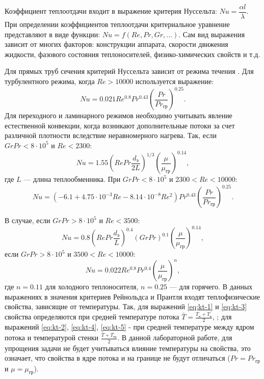 Коэффициент теплоотдачи входит в выражение критерия Нуссельта: $Nu=\dfrac{\alpha l}{\lambda}$. При определении коэффициентов теплоотдачи критериальное уравнение представляют в виде функции: $Nu= f (Re, Pr, Gr, ...)$. Сам вид выражения зависит от многих факторов: конструкции аппарата, скорости движения жидкости, фазового состояния теплоносителей, физико-химических свойств и т.д. 

Для прямых труб сечения критерий Нуссельта зависит от режима течения \cite{posobie}. Для турбулентного режима, когда $Re>10000$ используется выражение:
\begin{equation} \label{eq:kt-1}
	Nu=0.021 Re^{0.8} Pr^{0.43} \left( \dfrac{Pr}{Pr_{гр}} \right) ^{0.25} .
\end{equation}
Для переходного и ламинарного режимов необходимо учитывать явление естественной конвекции, когда возникают дополнительные потоки за счет различной плотности вследствие неравномерного нагрева. Так, если $Gr Pr < 8 \cdot 10^5$ и $Re < 2300 $:
\begin{equation} \label{eq:kt-2}
	Nu=1.55 \left(  Re Pr \dfrac{d_э}{2L}\right) ^ {1/3} \left( \dfrac{\mu}{\mu_{гр}} \right) ^{0.14},
\end{equation}
где $L$ --- длина теплообменника. При $Gr Pr < 8 \cdot 10^5$ и $2300 <Re < 10000 $:
\begin{equation} \label{eq:kt-3}
	Nu=(-6.1 +4.75 \cdot 10^{-3} Re -8.14\cdot 10^{-8} Re^2) Pr^{0.43} \left( \dfrac{Pr}{Pr_{гр}} \right) ^{0.25}.
\end{equation}

В случае, если $Gr Pr > 8 \cdot 10^5$ и $Re < 3500 $:
\begin{equation} \label{eq:kt-4}
Nu=0.8 \left( Re Pr \dfrac{d_э}{L}\right) ^{0.4} (Gr Pr)^{0.1} \left( \dfrac{\mu}{\mu_{гр}} \right) ^{0.14},
\end{equation}
если $Gr Pr > 8 \cdot 10^5$ и $3500 <Re < 10000 $:
\begin{equation} \label{eq:kt-5}
Nu=0.022 Re^{0.8} Pr^{0.4} \left( \dfrac{\mu}{\mu_{гр}} \right) ^{n},
\end{equation}
где $n = 0.11$ для холодного теплоносителя, $n = 0.25$ --- для горячего. В данных выражениях в значения критериев Рейнольдса и Прантля входят теплофизические свойства, зависящие от температуры. Так, для выражений \eqref{eq:kt-1} и \eqref{eq:kt-3} свойства определяются при средней температуре потока $\bar{T} = \frac{T_н + T_к}{2}$, ; для выражений \eqref{eq:kt-2}, \eqref{eq:kt-4}, \eqref{eq:kt-5} - при средней температуре между ядром потока и температурой стенки $\frac{\bar{T} + \bar{T_{гр}}}{2}$. В данной лабораторной работе, для упрощения задачи не будет учитываться влияние температуры на свойства, это означает, что свойства в ядре потока и на границе не будут отличаться ($Pr=Pr_{гр}$ и $\mu = \mu_{гр}$).

